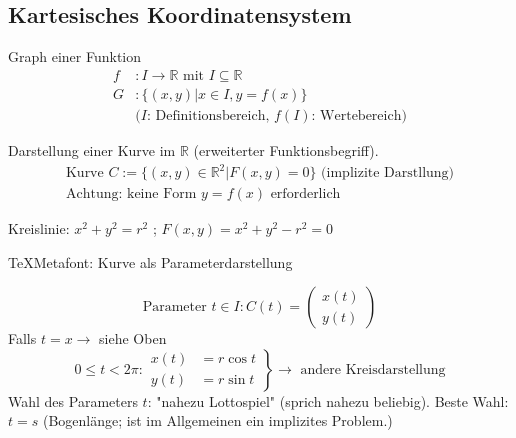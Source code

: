 \subsection{Kartesisches Koordinatensystem}
\begin{definition}
	Graph einer Funktion
	\begin{align*}
		f &: I \rightarrow \mathbb{R} \text{ mit }I \subseteq \mathbb{R} \\
		G &: \{(x,y) | x \in I, y = f(x)\} \\
		& \text{($I$: Definitionsbereich, $f(I)$: Wertebereich)}
	\end{align*}
\end{definition}
\begin{note}
	Darstellung einer Kurve im $\mathbb{R}$ (erweiterter Funktionsbegriff).
	\begin{gather*}
		\text{Kurve } C := \{(x, y) \in \mathbb{R}^2 | F(x, y) = 0\} \text{ (implizite Darstllung)} \\
		\text{Achtung: keine Form } y = f(x) \text{ erforderlich}
	\end{gather*}
	\begin{example}
		Kreislinie: $x^2 + y^2 = r^2$ ; $F(x,y) = x^2 + y^2 - r^2 = 0$
	\end{example}
	\begin{note}
		\TeX Metafont: Kurve als Parameterdarstellung
	\end{note}
	\begin{equation*}
		\text{Parameter }t \in I : C(t) = \left(\begin{aligned}x(t) \\ y(t)\end{aligned}\right)
	\end{equation*}
	Falls $t = x \rightarrow$ siehe Oben
	\begin{equation*}
		0 \leq t <2\pi: \left.\begin{aligned}x(t) &= r \cos t \\ y(t) &= r \sin t\end{aligned}\right\} \rightarrow\text{ andere Kreisdarstellung}
	\end{equation*}
	Wahl des Parameters $t$: "nahezu Lottospiel" (sprich nahezu beliebig). Beste Wahl: $t = s$ (Bogenlänge; ist im Allgemeinen ein implizites Problem.)
\end{note}

